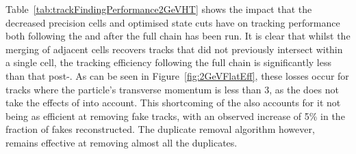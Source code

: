 Table~\ref{tab:trackFindingPerformance2GeVHT} shows the impact that the decreased precision \HT cells and optimised \KF state cuts have on tracking performance both following the \HT and after the full chain has been run.
It is clear that whilst the merging of adjacent \HT cells recovers tracks that did not previously intersect within a single \HT cell, the tracking efficiency following the full chain is significantly less than that post-\HT.
As can be seen in Figure~\ref{fig:2GeVFlatEff}, these losses occur for tracks where the particle's transverse momentum is less than 3\GeV, as the \KF does not take the effects of \MS into account.
This shortcoming of the \KF also accounts for it not being as efficient at removing fake tracks, with an observed increase of 5\% in the fraction of fakes reconstructed.
The duplicate removal algorithm however, remains effective at removing almost all the duplicates.

\begin{table}[htbp]
\label{tab:trackFindingPerformance2GeVHT}
  \centering
\end{table}

